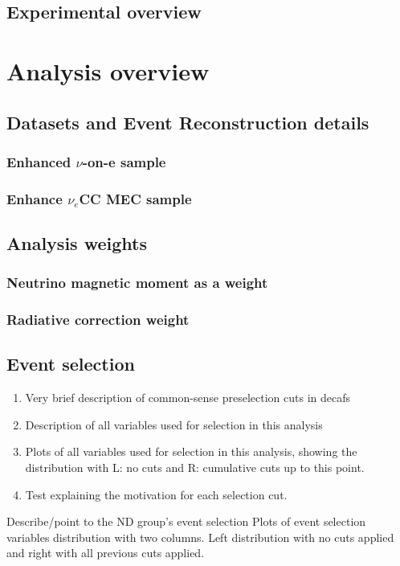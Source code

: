 \documentclass[12pt]{article}
\begin{document}
\subsection{Experimental overview}


\section{Analysis overview}
\subsection{Datasets and Event Reconstruction details}
\subsubsection{Enhanced $\nu$-on-e sample}
\subsubsection{Enhance $\nu_e$CC MEC sample}
\subsection{Analysis weights}
\subsubsection{Neutrino magnetic moment as a weight}
\subsubsection{Radiative correction weight}
\subsection{Event selection}
\begin{enumerate}
\item Very brief description of common-sense preselection cuts in decafs
\item Description of all variables used for selection in this analysis
\item Plots of all variables used for selection in this analysis, showing the distribution with L: no cuts and R: cumulative cuts up to this point.
\item Test explaining the motivation for each selection cut.
\end{enumerate}
Describe/point to the ND group's event selection
Plots of event selection variables distribution with two columns. Left distribution with no cuts applied and right with all previous cuts applied.
\end{document}
